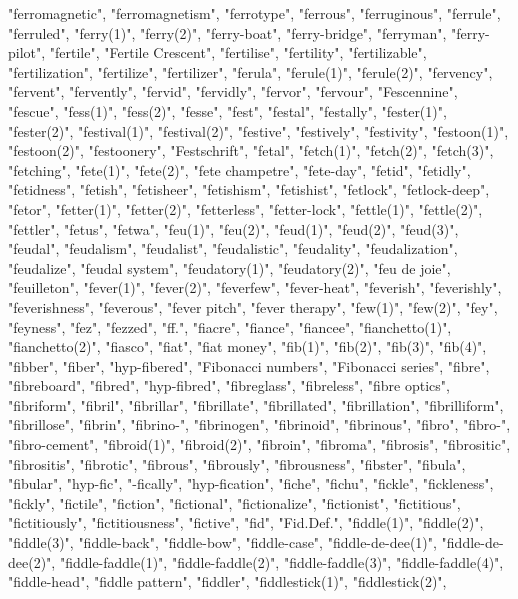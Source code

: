"ferromagnetic",
"ferromagnetism",
"ferrotype",
"ferrous",
"ferruginous",
"ferrule",
"ferruled",
"ferry(1)",
"ferry(2)",
"ferry-boat",
"ferry-bridge",
"ferryman",
"ferry-pilot",
"fertile",
"Fertile Crescent",
"fertilise",
"fertility",
"fertilizable",
"fertilization",
"fertilize",
"fertilizer",
"ferula",
"ferule(1)",
"ferule(2)",
"fervency",
"fervent",
"fervently",
"fervid",
"fervidly",
"fervor",
"fervour",
"Fescennine",
"fescue",
"fess(1)",
"fess(2)",
"fesse",
"fest",
"festal",
"festally",
"fester(1)",
"fester(2)",
"festival(1)",
"festival(2)",
"festive",
"festively",
"festivity",
"festoon(1)",
"festoon(2)",
"festoonery",
"Festschrift",
"fetal",
"fetch(1)",
"fetch(2)",
"fetch(3)",
"fetching",
"fete(1)",
"fete(2)",
"fete champetre",
"fete-day",
"fetid",
"fetidly",
"fetidness",
"fetish",
"fetisheer",
"fetishism",
"fetishist",
"fetlock",
"fetlock-deep",
"fetor",
"fetter(1)",
"fetter(2)",
"fetterless",
"fetter-lock",
"fettle(1)",
"fettle(2)",
"fettler",
"fetus",
"fetwa",
"feu(1)",
"feu(2)",
"feud(1)",
"feud(2)",
"feud(3)",
"feudal",
"feudalism",
"feudalist",
"feudalistic",
"feudality",
"feudalization",
"feudalize",
"feudal system",
"feudatory(1)",
"feudatory(2)",
"feu de joie",
"feuilleton",
"fever(1)",
"fever(2)",
"feverfew",
"fever-heat",
"feverish",
"feverishly",
"feverishness",
"feverous",
"fever pitch",
"fever therapy",
"few(1)",
"few(2)",
"fey",
"feyness",
"fez",
"fezzed",
"ff.",
"fiacre",
"fiance",
"fiancee",
"fianchetto(1)",
"fianchetto(2)",
"fiasco",
"fiat",
"fiat money",
"fib(1)",
"fib(2)",
"fib(3)",
"fib(4)",
"fibber",
"fiber",
"hyp-fibered",
"Fibonacci numbers",
"Fibonacci series",
"fibre",
"fibreboard",
"fibred",
"hyp-fibred",
"fibreglass",
"fibreless",
"fibre optics",
"fibriform",
"fibril",
"fibrillar",
"fibrillate",
"fibrillated",
"fibrillation",
"fibrilliform",
"fibrillose",
"fibrin",
"fibrino-",
"fibrinogen",
"fibrinoid",
"fibrinous",
"fibro",
"fibro-",
"fibro-cement",
"fibroid(1)",
"fibroid(2)",
"fibroin",
"fibroma",
"fibrosis",
"fibrositic",
"fibrositis",
"fibrotic",
"fibrous",
"fibrously",
"fibrousness",
"fibster",
"fibula",
"fibular",
"hyp-fic",
"-fically",
"hyp-fication",
"fiche",
"fichu",
"fickle",
"fickleness",
"fickly",
"fictile",
"fiction",
"fictional",
"fictionalize",
"fictionist",
"fictitious",
"fictitiously",
"fictitiousness",
"fictive",
"fid",
"Fid.Def.",
"fiddle(1)",
"fiddle(2)",
"fiddle(3)",
"fiddle-back",
"fiddle-bow",
"fiddle-case",
"fiddle-de-dee(1)",
"fiddle-de-dee(2)",
"fiddle-faddle(1)",
"fiddle-faddle(2)",
"fiddle-faddle(3)",
"fiddle-faddle(4)",
"fiddle-head",
"fiddle pattern",
"fiddler",
"fiddlestick(1)",
"fiddlestick(2)",
